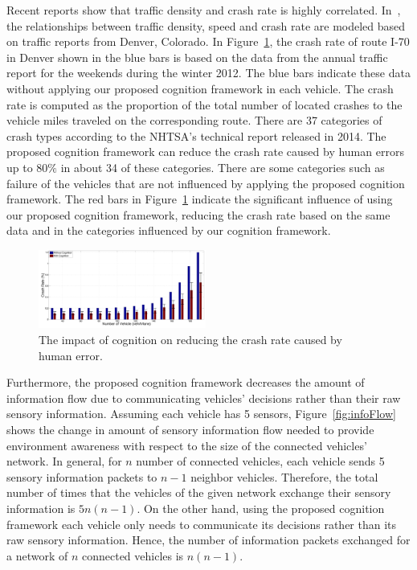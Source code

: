 \documentclass[journal, 11pt]{IEEEtran}
\begin{document}
Recent reports show that traffic density and crash rate is highly correlated.
In~\cite{trb12}, the relationships between traffic density, speed and crash rate
are modeled based on traffic reports from Denver, Colorado. In
Figure~\ref{fig:errorPlot}, the crash rate of route I-70 in Denver shown in the
blue bars is based on the data from the annual traffic report for the weekends
during the winter 2012. The blue bars indicate these data without applying our
proposed cognition framework in each vehicle. The crash rate is computed as the
proportion of  the total number of located crashes to the vehicle miles traveled
on the corresponding route. There are 37 categories of crash types according to
the NHTSA's technical report released in 2014. The proposed cognition framework
can reduce the crash rate caused by human errors up to $80\%$ in about 34 of
these categories. There are some categories such as failure of the vehicles that
are not influenced by applying the proposed cognition framework. The red bars in
Figure~\ref{fig:errorPlot} indicate the significant influence of using our
proposed cognition framework, reducing the crash rate based on the same data and
in the categories influenced by our cognition framework.

\begin{figure}[!t]
  \centering
  \includegraphics[width=0.49\textwidth]{figs/errorPlot.pdf}
  \caption{{\fontsize{10}{10}\selectfont The impact of cognition on reducing the
  crash rate caused by human error.}}
  \label{fig:errorPlot}
  \vspace*{-6mm}
\end{figure}

Furthermore, the proposed cognition framework decreases the amount of
information flow due to communicating vehicles' decisions rather than their raw
sensory information. Assuming each vehicle has 5 sensors,
Figure~\ref{fig:infoFlow} shows the change in amount of sensory information flow
needed to provide environment awareness with respect to the size of the
connected vehicles' network. In general, for $n$ number of connected vehicles,
each vehicle sends 5 sensory information packets to $n - 1$ neighbor vehicles.
Therefore, the total number of times that the vehicles of the given network
exchange their sensory information is $5n(n-1)$. On the other hand, using the
proposed cognition framework each vehicle only needs to communicate its
decisions rather than its raw sensory information. Hence, the number of
information packets exchanged for a network of $n$ connected vehicles is
$n(n-1)$.
\end{document}
